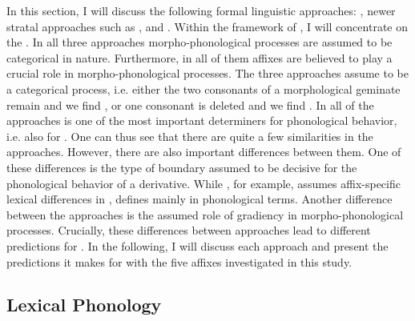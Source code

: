 In this section, I will discuss the following formal linguistic approaches: , newer stratal approaches such as , and . Within the framework of , I will concentrate on the .  In all three approaches morpho-phonological processes are assumed to be categorical in nature. Furthermore, in all of them affixes are believed to play a crucial role in morpho-phonological processes. The three approaches assume  to be a categorical process, i.e. either the two consonants of a morphological geminate remain and we find , or one consonant is deleted and we find . In all of the approaches  is one of the most important determiners for phonological behavior, i.e. also for . 
One can thus see that there are quite a few similarities in the approaches. However, there are also important differences between them. One of these differences is the type of boundary assumed to be decisive for the phonological behavior of a derivative. While , for example, assumes affix-specific lexical differences in ,  defines  mainly in phonological terms. 
Another difference between the approaches is the assumed role of gradiency in morpho-phonological processes.
Crucially, these differences between approaches lead to different predictions for . In the following, I will discuss each approach and present the predictions it makes for  with the five affixes investigated in this study.


\subsection{Lexical Phonology} \label{LexPhon}


